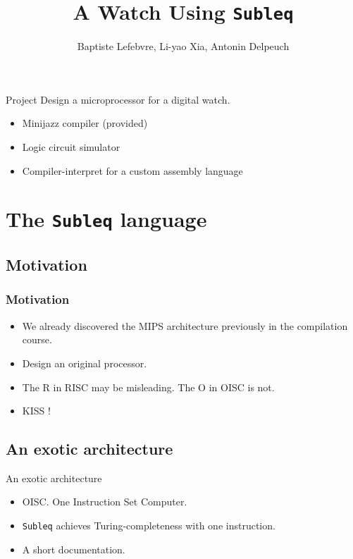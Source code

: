 \documentclass{beamer}
\title{A Watch Using \texttt{Subleq}}
\author{Baptiste Lefebvre, Li-yao Xia, Antonin Delpeuch}
\date{\begin{tikzpicture}[scale=0.25, every node/.style={transform shape}]
        \node at (0,0) (n0) {};
        \SSGNb[0.75cm]{n0}{2}
        \node at (1,0) (n1) {};
        \SSGNb[0.75cm]{n1}{0}
        \node at (2,0) (n2) {};
        \SSGNb[0.75cm]{n2}{1}
        \node at (3,0) (n3) {};
        \SSGNb[0.75cm]{n3}{3}
        \node at (4.5,0) (n4) {};
        \SSGNb[0.75cm]{n4}{0}
        \node at (5.5,0) (n5) {};
        \SSGNb[0.75cm]{n5}{1}
        \node at (7,0) (n6) {};
        \SSGNb[0.75cm]{n6}{2}
        \node at (8,0) (n7) {};
        \SSGNb[0.75cm]{n7}{2}
        \node at (9.5,0) (n8) {};
        \SSGNb[0.75cm]{n8}{1}
        \node at (10.5,0) (n9) {};
        \SSGNb[0.75cm]{n9}{5}
        \node at (12,0) (n10) {};
        \SSGNb[0.75cm]{n10}{5}
        \node at (13,0) (n11) {};
        \SSGNb[0.75cm]{n11}{5}
  \end{tikzpicture}}
\begin{document}
\makeatletter

\begin{frame}
    \maketitle
\end{frame}


\begin{frame}{Project}
  Design a microprocessor for a digital watch.
  \begin{itemize}
    \item Minijazz compiler (provided)
    \item Logic circuit simulator
    \item Compiler-interpret for a custom assembly language
  \end{itemize}
\end{frame}

\section{The \texttt{Subleq} language}
\subsection{Motivation}
\begin{frame}
  \frametitle{Motivation}
  \begin{itemize}
    \item We already discovered the MIPS architecture previously
      in the compilation course.
    \item<2-> Design an original processor.
    \item<3-> The R in RISC may be misleading. The O in OISC is not.
    \item<4-> KISS !
  \end{itemize}
\end{frame}

\subsection{An exotic architecture}
\begin{frame}{An exotic architecture}
  \begin{itemize}
    \item OISC. One Instruction Set Computer.
    \item<2-> \texttt{Subleq} achieves Turing-completeness
      with one instruction.
    \item<3-> A short documentation. %
  \end{itemize}
\end{frame}
\end{document}
